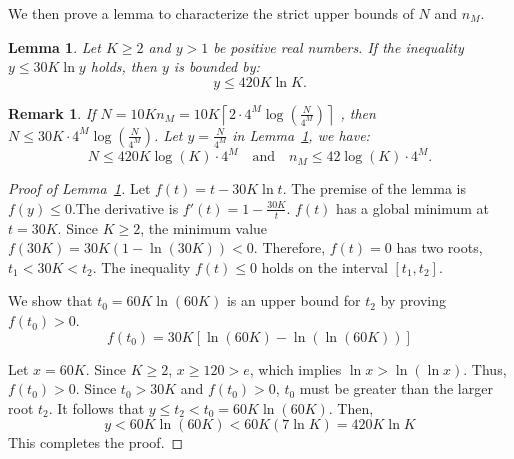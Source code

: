 \documentclass[
  12pt]{article}
\newtheorem{lemma}{Lemma}
\newtheorem{note}{Remark}
\begin{document}
We then prove a lemma to characterize the strict upper bounds of \(N\) and \(n_M\).
\begin{lemma}
\label{Upper bound of N}
Let $K \ge 2$ and $y > 1$ be positive real numbers. If the inequality $y \le 30K \ln y$ holds, then $y$ is bounded by:
$$y \le 420K \ln K.$$
\end{lemma}

\begin{note}
\label{Remark 8}
If $N=10Kn_{M}=10 K \left\lceil 2\cdot 4^M\log\left(\frac{N}{4^M}\right) \right\rceil$ , then  $N\leq 30K\cdot4^M\log\left(\frac{N}{4^M}\right)$. Let $y=\frac{N}{4^M}$ in Lemma~\ref{Upper bound of N}, we have:
$$N\leq420K\log(K)\cdot 4^M  \quad\text{and} \quad n_M\leq42\log(K)\cdot 4^M . $$
\end{note}

\begin{proof}[Proof of Lemma~\ref{Upper bound of N}]
    Let $f(t) = t - 30K \ln t$. The premise of the lemma is $f(y) \le 0$.The derivative is $f'(t) = 1 - \frac{30K}{t}$. $f(t)$ has a global minimum at $t = 30K$.
    Since $K \ge 2$, the minimum value $f(30K) = 30K(1 - \ln(30K)) < 0$.
    Therefore, $f(t)=0$ has two roots, $t_1 < 30K < t_2$. The inequality $f(t) \le 0$ holds on the interval $[t_1, t_2]$. 

    We show that $t_0 = 60K \ln(60K)$ is an upper bound for $t_2$ by proving $f(t_0) > 0$.
 $$ f(t_0) = 30K[\ln(60K) - \ln(\ln(60K))]$$
   
    Let $x = 60K$. Since $K \ge 2$, $x \ge 120 > e$, which implies $\ln x > \ln(\ln x)$.
    Thus, $f(t_0) > 0$.
    Since $t_0 > 30K$ and $f(t_0) > 0$, $t_0$ must be greater than the larger root $t_2$.
    It follows that $y \le t_2 < t_0 = 60K \ln(60K)$. Then, 
    $$
    y < 60K \ln(60K) < 60K (7 \ln K) = 420K \ln K
    $$
This completes the proof.
\end{proof}
\end{document}
